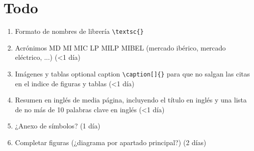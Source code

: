 \documentclass[final, 12pt, oneside]{class_diss}
\begin{document}
\section*{Todo}
\begin{enumerate}
  \item Formato de nombres de librería  \texttt{\textbackslash textsc\{\}}
  \item Acrónimos MD MI MIC LP MILP MIBEL (mercado ibérico, mercado eléctrico, ...) (<1 día)
  \item Imágenes y tablas optional caption \texttt{\textbackslash caption[]\{\}} para que no salgan las citas en el indice de figuras y tablas (<1 día)
  \item Resumen en inglés de media página, incluyendo el título en inglés y una lista de no más de 10 palabras clave en inglés (<1 día)
  \item ¿Anexo de símbolos? (1 día)
  \item Completar figuras (¿diagrama por apartado principal?) (2 días)
\end{enumerate}

\setcounter{page}{-1}







\vfill

\newpage
{}
\setcounter{page}{1}

{}

\tableofcontents
\listoffigures
\listoftables

\newpage
{}
\setcounter{page}{1}





% 

% 


\nocite{*}



\appendix

\end{document}

